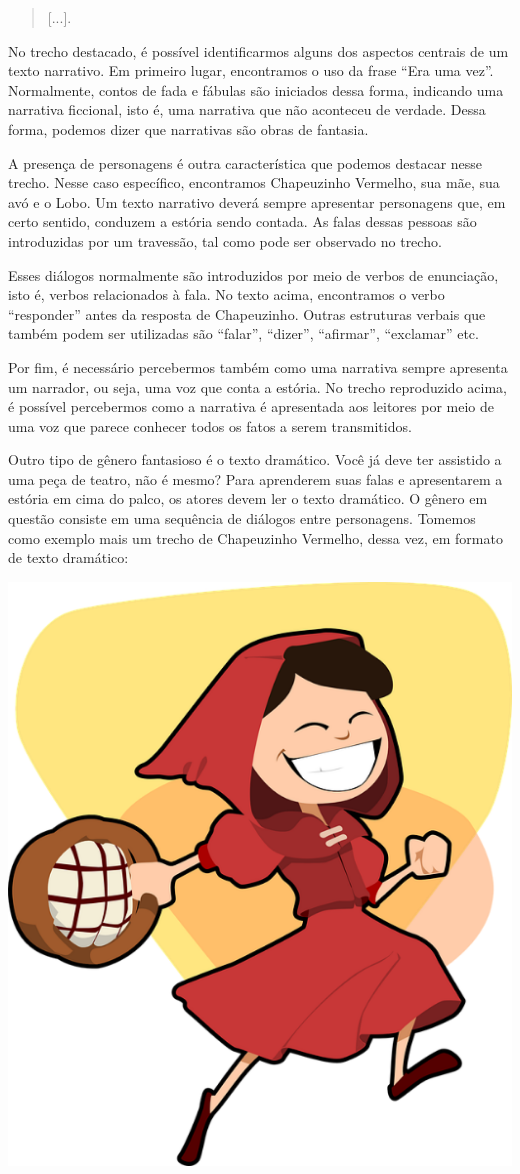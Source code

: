 {\begin{quote}
{[}...{]}.
\end{quote}

No trecho destacado, é possível identificarmos alguns dos aspectos
centrais de um texto narrativo. Em primeiro lugar, encontramos o uso da
frase ``Era uma vez''. Normalmente, contos de fada e fábulas são
iniciados dessa forma, indicando uma narrativa ficcional, isto é, uma
narrativa que não aconteceu de verdade. Dessa forma, podemos dizer que
narrativas são obras de fantasia.

A presença de personagens é outra característica que podemos destacar
nesse trecho. Nesse caso específico, encontramos Chapeuzinho Vermelho,
sua mãe, sua avó e o Lobo. Um texto narrativo deverá sempre apresentar
personagens que, em certo sentido, conduzem a estória sendo contada. As
falas dessas pessoas são introduzidas por um travessão, tal como pode
ser observado no trecho.

Esses diálogos normalmente são introduzidos por meio de verbos de
enunciação, isto é, verbos relacionados à fala. No texto acima,
encontramos o verbo ``responder'' antes da resposta de Chapeuzinho.
Outras estruturas verbais que também podem ser utilizadas são ``falar'',
``dizer'', ``afirmar'', ``exclamar'' etc.

Por fim, é necessário percebermos também como uma narrativa sempre
apresenta um narrador, ou seja, uma voz que conta a estória. No trecho
reproduzido acima, é possível percebermos como a narrativa é apresentada
aos leitores por meio de uma voz que parece conhecer todos os fatos a
serem transmitidos.

Outro tipo de gênero fantasioso é o texto dramático. Você já deve ter
assistido a uma peça de teatro, não é mesmo? Para aprenderem suas falas
e apresentarem a estória em cima do palco, os atores devem ler o texto
dramático. O gênero em questão consiste em uma sequência de diálogos
entre personagens. Tomemos como exemplo mais um trecho de Chapeuzinho
Vermelho, dessa vez, em formato de texto dramático:

\includegraphics[width=.5\textwidth]{./imgs/img5.jpg}

}
